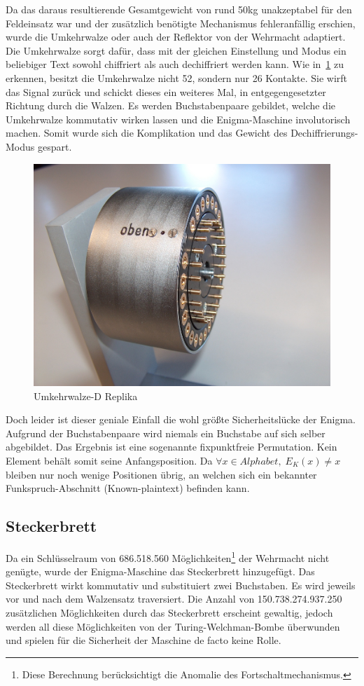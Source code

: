 Da das daraus resultierende Gesamtgewicht von rund 50\si{\kg} unakzeptabel für den Feldeinsatz war und der zusätzlich benötigte Mechanismus fehleranfällig erschien, wurde die Umkehrwalze oder auch der Reflektor von der Wehrmacht adaptiert.
Die Umkehrwalze sorgt dafür, dass 
mit der gleichen Einstellung und \glqq Modus\grqq{} ein beliebiger Text sowohl chiffriert als auch dechiffriert werden kann.
Wie in~\cref{fig:enigma_reflector} zu erkennen, besitzt die Umkehrwalze nicht 52, sondern nur 26 Kontakte.
Sie \glqq wirft\grqq{} das Signal zurück und schickt dieses ein weiteres Mal, in entgegengesetzter Richtung durch die Walzen.
Es werden Buchstabenpaare gebildet, welche die Umkehrwalze kommutativ wirken lassen und die Enigma-Maschine involutorisch machen.
Somit wurde sich die Komplikation und das Gewicht des Dechiffrierungs-Modus gespart.

\begin{figure}[htbp]
	\centering
	\includegraphics[width=.5\linewidth]{Enigma/UKW-D}
	\caption{Umkehrwalze-D Replika\autocite{enigmareflektor}}
	\label{fig:enigma_reflector}
\end{figure}

Doch leider ist dieser geniale Einfall die wohl größte Sicherheitslücke der Enigma.
Aufgrund der Buchstabenpaare wird niemals ein Buchstabe auf sich selber abgebildet.
Das Ergebnis ist eine sogenannte fixpunktfreie Permutation.
Kein Element behält somit seine Anfangsposition.
Da $\forall x \in Alphabet,\; E_K(x) \ne x$ bleiben nur noch wenige Positionen übrig, an welchen sich ein bekannter Funkspruch-Abschnitt (Known-plaintext) befinden kann.


\subsection{Steckerbrett}\label{subsec:steckerbrett}

Da ein Schlüsselraum von 686.518.560 Möglichkeiten\footnote{Diese Berechnung berücksichtigt die Anomalie des Fortschaltmechanismus.\autocite{wiki:enigma}} der Wehrmacht nicht genügte, wurde der Enigma-Maschine das Steckerbrett hinzugefügt.
Das Steckerbrett wirkt kommutativ und substituiert zwei Buchstaben. 
Es wird jeweils vor und nach dem Walzensatz traversiert. 
Die Anzahl von 150.738.274.937.250\autocite{wiki:enigma} zusätzlichen Möglichkeiten durch das Steckerbrett erscheint gewaltig, jedoch werden all diese Möglichkeiten von der Turing-Welchman-Bombe überwunden und spielen für die Sicherheit der Maschine de facto keine Rolle.

